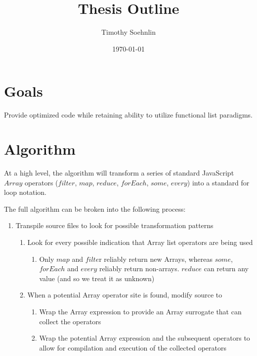 \documentclass{article}
\title{Thesis Outline}
\author{Timothy Soehnlin}
\date{\today}
\begin{document}
\section{Goals}
Provide optimized code while retaining ability to utilize functional list paradigms.

\section{Algorithm}
At a high level, the algorithm will transform a series of standard JavaScript $Array$ operators ($filter$, $map$, 
$reduce$, $forEach$, $some$, $every$) into a standard for loop notation.  

The full algorithm can be broken into the following process:
\begin{enumerate}
  \item Transpile source files to look for possible transformation patterns
  \begin{enumerate}
    \item Look for every possible indication that Array list operators are being used
    \begin{enumerate}
      \item Only $map$ and $filte$r reliably return new Arrays, whereas $some$, 
        $forEach$ and $every$ reliably return non-arrays.  $reduce$ can return 
        any value (and so we treat it as unknown)    
    \end{enumerate}
    \item When a potential Array operator site is found, modify source to
    \begin{enumerate} 
      \item	Wrap the Array expression to provide an Array surrogate that can collect the operators
      \item	Wrap the potential Array expression and the subsequent operators to allow for compilation and execution of the collected operators
    \end{enumerate}    
  \end{enumerate}
  
\end{enumerate}
\end{document}
